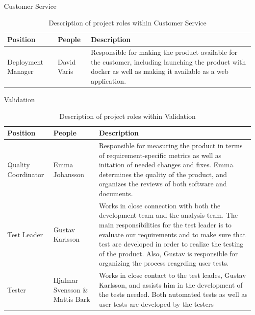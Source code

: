 \begin{table}[H]

\begin{center}
\begin{huge}
    Customer Service
\end{huge}
\begin{tabular}{ | m{4cm} |m{3cm} |m{10cm}|| } 
\hline
\textbf{Position} & \textbf{People} & \textbf{Description} \\ 
\hline
Deployment Manager & David Varis & Responsible for making the product available for the customer, including launching the product with docker as well as making it available as a web application. \\
\hline
\end{tabular}


\end{center}
\caption{\label{tab:table-name}Description of project roles within Customer Service}

\end{table}
\begin{table}[!hbtp]

\begin{center}
\begin{huge}
    Validation
\end{huge}
\begin{tabular}{ | m{4cm} |m{3cm} |m{10cm}| } 
\hline
\textbf{Position} & \textbf{People} & \textbf{Description} \\ 
\hline
Quality Coordinator & Emma Johansson & Responsible for measuring the product in terms of requirement-specific metrics as well as initation of needed changes and fixes. Emma determines the quality of the product, and organizes the reviews of both software and documents.  \\
\hline
Test Leader & Gustav Karlsson & Works in close connection with both the development team and the analysis team. The main responsibilities for the test leader is to evaluate our requirements and to make sure that test are developed in order to realize the testing of the product. Also, Gustav is responsible for organizing the process reagrding user tests.   \\
\hline
Tester & Hjalmar Svensson \& Mattis Bark & Works in close contact to the test leades, Gustav Karlsson, and assists him in the development of the tests needed. Both automated tests as well as user tests are developed by the testers \\
\hline
\end{tabular}


\end{center}
\caption{\label{tab:table-name}Description of project roles within Validation}

\end{table}
